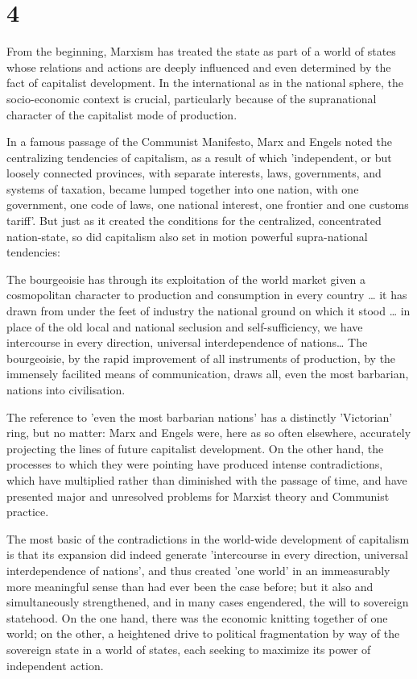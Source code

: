 \section*{4}
From the beginning, Marxism has treated the state as part of a world of states whose relations and actions are deeply influenced and even determined by the fact of capitalist development. In the international as in the national sphere, the socio\hyp{}economic context is crucial, particularly because of the supranational character of the capitalist mode of production.

In a famous passage of the Communist Manifesto, Marx and Engels noted the centralizing tendencies of capitalism, as a result of which 'independent, or but loosely connected provinces, with separate interests, laws, governments, and systems of taxation, became lumped together into one nation, with one government, one code of laws, one national interest, one frontier and one customs tariff'. But just as it created the conditions for the centralized, concentrated nation-state, so did capitalism also set in motion powerful supra-national tendencies:
\begin{displayquote}
    The bourgeoisie has through its exploitation of the world market given a cosmopolitan character to production and consumption in every country \dots{} it has drawn from under the feet of industry the national ground on which it stood \dots{} in place of the old local and national seclusion and self-sufficiency, we have intercourse in every direction, universal interdependence of nations\dots{} The bourgeoisie, by the rapid improvement of all instruments of production, by the immensely facilited means of communication, draws all, even the most barbarian, nations into civilisation.
\end{displayquote}

The reference to 'even the most barbarian nations' has a distinctly 'Victorian' ring, but no matter: Marx and Engels were, here as so often elsewhere, accurately projecting the lines of future capitalist development. On the other hand, the processes to which they were pointing have produced intense contradictions, which have multiplied rather than diminished with the passage of time, and have presented major and unresolved problems for Marxist theory and Communist practice.

The most basic of the contradictions in the world-wide development of capitalism is that its expansion did indeed generate 'intercourse in every direction, universal interdependence of nations', and thus created 'one world' in an immeasurably more meaningful sense than had ever been the case before; but it also and simultaneously strengthened, and in many cases engendered, the will to sovereign statehood. On the one hand, there was the economic knitting together of one world; on the other, a heightened drive to political fragmentation by way of the sovereign state in a world of states, each seeking to maximize its power of independent action.

